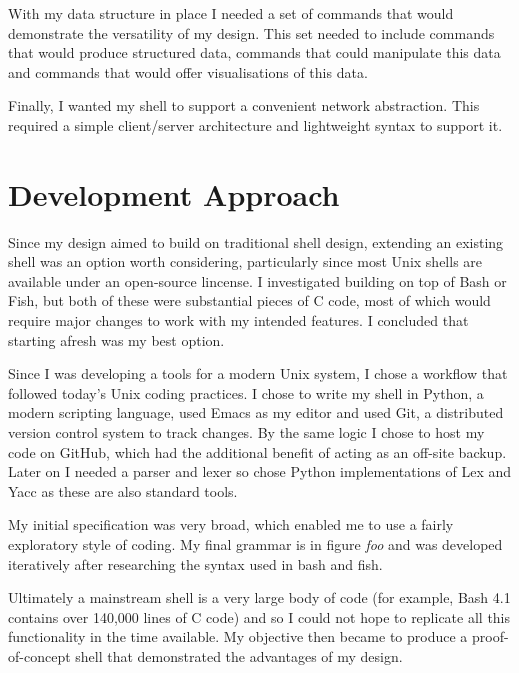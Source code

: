 \documentclass[12pt,twoside,notitlepage]{report}
\begin{document}
With my data structure in place I needed a set of commands that would
demonstrate the versatility of my design. This set needed to include commands
that would produce structured data, commands that could manipulate this data and
commands that would offer visualisations of this data.

Finally, I wanted my shell to support a convenient network abstraction. This
required a simple client/server architecture and lightweight syntax to support it.

\section{Development Approach}
Since my design aimed to build on traditional shell design, extending an
existing shell was an option worth considering, particularly since most Unix
shells are available under an open-source lincense. I investigated building on
top of Bash or Fish, but both of these were substantial pieces of C code, most
of which would require major changes to work with my intended features. I
concluded that starting afresh was my best option.

Since I was developing a tools for a modern Unix system, I chose a workflow that
followed today's Unix coding practices. I chose to write my shell in Python, a
modern scripting language, used Emacs as my editor and used Git, a distributed
version control system to track changes. By the same logic I chose to host my
code on GitHub, which had the additional benefit of acting as an off-site
backup. Later on I needed a parser and lexer so chose Python implementations of
Lex and Yacc as these are also standard tools.

My initial specification was very broad, which enabled me to use a fairly
exploratory style of coding. My final grammar is in figure {\em foo} and was
developed iteratively after researching the syntax used in bash and fish.

Ultimately a mainstream shell is a very large body of code (for example, Bash
4.1 contains over 140,000 lines of C code) and so I could not hope to replicate all
this functionality in the time available. My objective then became to produce a
proof-of-concept shell that demonstrated the advantages of my design.



\end{document}
